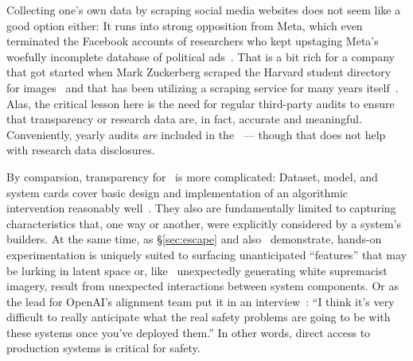 Collecting one's own data by scraping social media websites does not seem like a
good option either: It runs into strong opposition from Meta, which even
terminated the Facebook accounts of researchers who kept upstaging Meta's
woefully incomplete database of political
ads~\cite{EdelsonMcCoy2021a,Faife2021a,MerrillTobin2019,Roose2021a}. That is a
bit rich for a company that got started when Mark Zuckerberg scraped the Harvard
student directory for images~\cite{Madrigal2019} and that has been utilizing a
scraping service for many years itself~\cite{Newman2023}. Alas, the critical
lesson here is the need for regular third-party audits to ensure that
transparency or research data are, in fact, accurate and meaningful.
Conveniently, yearly audits \emph{are} included in the \DSA\ --- though that
does not help with research data disclosures.


By comparsion, transparency for \AI\ is more complicated: Dataset, model, and
system cards cover basic design and implementation of an algorithmic
intervention reasonably
well~\cite{GebruMorgensternea2021,MitchellWuea2019,ProcopeCheemaea2022}. They
also are fundamentally limited to capturing characteristics that, one way or
another, were explicitly considered by a system's builders. At the same time, as
\S\ref{sec:escape} and also~\cite{BirhanePrabhuea2021,CarliniHayesea2023}
demonstrate, hands-on experimentation is uniquely suited to surfacing
unanticipated ``features'' that may be lurking in latent space or, like \DALLE\
unexpectedly generating white supremacist imagery, result from unexpected
interactions between system components. Or as the lead for OpenAI's alignment
team put it in an interview~\cite{Heaven2023}: ``I think it's very difficult to
really anticipate what the real safety problems are going to be with these
systems once you've deployed them.'' In other words, direct access to production
systems is critical for safety.

